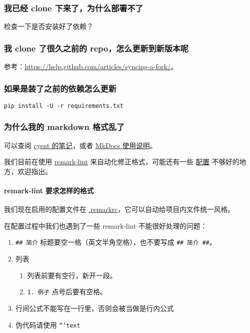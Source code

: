 \subsubsection{我已经 clone 下来了，为什么部署不了}

检查一下是否安装好了依赖？

\subsubsection{我 clone 了很久之前的 repo，怎么更新到新版本呢}

参考：\url{https://help.github.com/articles/syncing-a-fork/}。

\subsubsection{如果是装了之前的依赖怎么更新}

\begin{verbatim}
pip install -U -r requirements.txt
\end{verbatim}

\subsubsection{为什么我的 markdown 格式乱了}

可以查阅 \href{https://cyent.github.io/markdown-with-mkdocs-material/}{cyent 的笔记}，或者 \href{https://github.com/ctf-wiki/ctf-wiki/wiki/Mkdocs-\%E4%BD%BF%E7%94%A8%E8%AF%B4%E6%98%8E}{MkDocs 使用说明}。

我们目前在使用 \href{https://github.com/remarkjs/remark-lint}{remark-lint} 来自动化修正格式，可能还有一些 \href{https://github.com/24OI/OI-wiki/blob/master/.remarkrc}{配置} 不够好的地方，欢迎指出。

\paragraph{remark-lint 要求怎样的格式}

我们现在启用的配置文件在 \href{https://github.com/24OI/OI-wiki/blob/master/.remarkrc}{.remarkrc}，它可以自动给项目内文件统一风格。

在配置过程中我们也遇到了一些 remark-lint 不能很好处理的问题：

\begin{enumerate}
\item \texttt{\#\# 简介} 标题要空一格（英文半角空格），也不要写成 \texttt{\#\# 简介 \#\#}。
\item 列表
\begin{enumerate}
\item 列表前要有空行，新开一段。
\item \texttt{1. 例子} 点号后要有空格。
\end{enumerate}
\item 行间公式不能写在一行里，否则会被当做是行内公式
\item 伪代码请使用 \texttt{```text}
\end{enumerate}

